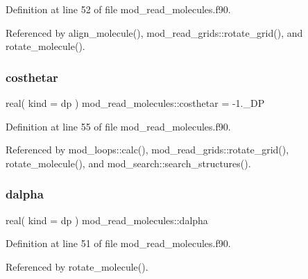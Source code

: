 Definition at line 52 of file mod\+\_\+read\+\_\+molecules.\+f90.



Referenced by align\+\_\+molecule(), mod\+\_\+read\+\_\+grids\+::rotate\+\_\+grid(), and rotate\+\_\+molecule().

\mbox{\label{namespacemod__read__molecules_afe28a6b2c9ac300c072b7315c4cf36fb}} 
\subsubsection{\texorpdfstring{costhetar}{costhetar}}
{\footnotesize\ttfamily real( kind = dp ) mod\+\_\+read\+\_\+molecules\+::costhetar = -\/1.\+\_\+\+DP}



Definition at line 55 of file mod\+\_\+read\+\_\+molecules.\+f90.



Referenced by mod\+\_\+loops\+::calc(), mod\+\_\+read\+\_\+grids\+::rotate\+\_\+grid(), rotate\+\_\+molecule(), and mod\+\_\+search\+::search\+\_\+structures().

\mbox{\label{namespacemod__read__molecules_a25040f2691a3f50a481882e7e6a9816d}} 
\subsubsection{\texorpdfstring{dalpha}{dalpha}}
{\footnotesize\ttfamily real( kind = dp ) mod\+\_\+read\+\_\+molecules\+::dalpha}



Definition at line 51 of file mod\+\_\+read\+\_\+molecules.\+f90.



Referenced by rotate\+\_\+molecule().

\mbox{\label{namespacemod__read__molecules_a9947a968e59ca99a71fee1f02e557172}} 
